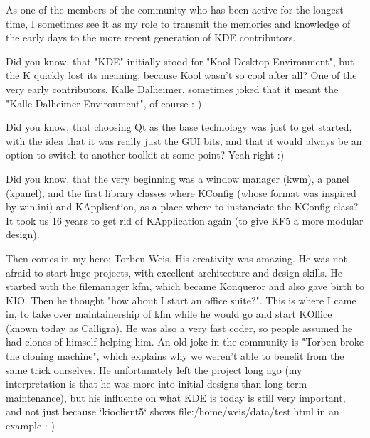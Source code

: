 

\noindent{}As one of the members of the community who has been active for the longest time, I sometimes see it as my role to transmit the memories and knowledge of the early days to the more recent generation of KDE contributors.

Did you know, that "KDE" initially stood for "Kool Desktop Environment", but the K quickly lost its meaning, because Kool wasn't so cool after all?
One of the very early contributors, Kalle Dalheimer, sometimes joked that it meant the "Kalle Dalheimer Environment", of course :-)

Did you know, that choosing Qt as the base technology was just to get started, with the idea that it was really just the GUI bits, and that it would always be an option to switch to another toolkit at some point? Yeah right :)

Did you know, that the very beginning was a window manager (kwm), a panel (kpanel), and the first library classes where KConfig (whose format was inspired by win.ini) and KApplication, as a place where to instanciate the KConfig class? It took us 16 years to get rid of KApplication again (to give KF5 a more modular design).

Then comes in my hero: Torben Weis. His creativity was amazing. He was not afraid to start huge projects, with excellent architecture and design skills. He started with the filemanager kfm, which became Konqueror and also gave birth to KIO. Then he thought "how about I start an office suite?". This is where I came in, to take over maintainership of kfm while he would go and start KOffice (known today as Calligra).
He was also a very fast coder, so people assumed he had clones of himself helping him. An old joke in the community is "Torben broke the cloning machine", which explains why we weren't able to benefit from the same trick ourselves.
He unfortunately left the project long ago (my interpretation is that he was more into initial designs than long-term maintenance), but his influence on what KDE is today is still very important, and not just because `kioclient5` shows file:/home/weis/data/test.html in an example :-)

